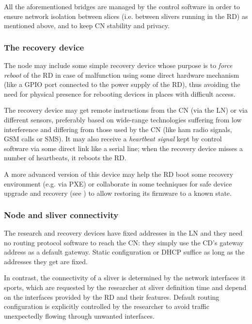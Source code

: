 \documentclass[conference]{IEEEtran}
\begin{document}
All the aforementioned bridges are managed by the control software in order to
ensure network isolation between slices (i.e. between slivers running in the
RD) as mentioned above, and to keep CN stability and privacy.

\subsubsection{The recovery device}

The node may include some simple recovery device whose purpose is to
\emph{force reboot} of the RD in case of malfunction using some direct
hardware mechanism (like a GPIO port connected to the power supply of the RD),
thus avoiding the need for physical presence for rebooting devices in places
with difficult access.

The recovery device may get remote instructions from the CN (via the LN) or
via different sensors, preferably based on wide-range technologies suffering
from low interference and differing from those used by the CN (like ham radio
signals, GSM calls or SMS).  It may also receive a \emph{heartbeat signal}
kept by control software via some direct link like a serial line; when the
recovery device misses a number of heartbeats, it reboots the RD.

A more advanced version of this device may help the RD boot some recovery
environment (e.g. via PXE) or collaborate in some techniques for safe device
upgrade and recovery (see \cite{van12}) to allow restoring its firmware to a
known state.


\subsubsection{Node and sliver connectivity}
\label{sec:connectivity}

The research and recovery devices have fixed addresses in the LN and they need
no routing protocol software to reach the CN: they simply use the CD's gateway
address as a default gateway.  Static configuration or DHCP suffice as long as
the addresses they get are fixed.

In contrast, the connectivity of a sliver is determined by the network
interfaces it sports, which are requested by the researcher at sliver
definition time and depend on the interfaces provided by the RD and their
features.  Default routing configuration is explicitly controlled by the
researcher to avoid traffic unexpectedly flowing through unwanted interfaces.
\end{document}
